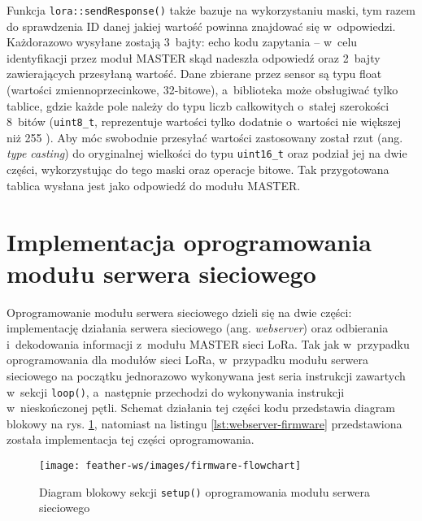 \FloatBarrier
Funkcja \texttt{lora::sendResponse()} także bazuje na wykorzystaniu maski, tym razem do sprawdzenia ID danej jakiej
wartość powinna znajdować się w~odpowiedzi. Każdorazowo wysyłane zostają 3~bajty: echo kodu zapytania -- w~celu
identyfikacji przez moduł MASTER skąd nadeszła odpowiedź oraz 2~bajty zawierających przesyłaną wartość. Dane zbierane
przez sensor są typu float (wartości zmiennoprzecinkowe, 32-bitowe), a~biblioteka może obsługiwać tylko tablice, gdzie
każde pole należy do typu liczb całkowitych o~stałej szerokości 8~bitów (\texttt{uint8\_t}, reprezentuje wartości tylko
dodatnie o~wartości nie większej niż 255 \cite{cpp-fwinteger}). Aby móc swobodnie przesyłać wartości zastosowany został
rzut (ang. \textsl{type casting}) do oryginalnej wielkości do typu \texttt{uint16\_t} oraz podział jej na dwie części,
wykorzystując do tego maski oraz operacje bitowe. Tak przygotowana tablica wysłana jest jako odpowiedź do modułu MASTER.

\FloatBarrier
\section{Implementacja oprogramowania modułu serwera sieciowego\label{sect:firmware-webserver}} Oprogramowanie modułu
serwera sieciowego dzieli się na dwie części: implementację działania serwera sieciowego (ang. \textsl{webserver}) oraz
odbierania i~dekodowania informacji z~modułu MASTER sieci LoRa. Tak jak w~przypadku oprogramowania dla modułów sieci
LoRa, w~przypadku modułu serwera sieciowego na początku jednorazowo wykonywana jest seria instrukcji zawartych w~sekcji
\texttt{loop()}, a~następnie przechodzi do wykonywania instrukcji w~nieskończonej pętli. Schemat działania tej części
kodu przedstawia diagram blokowy na rys. \ref{img:webserver-firmware}, natomiast na listingu
\ref{lst:webserver-firmware} przedstawiona została implementacja tej części oprogramowania.

\begin{figure}[!htbp]
    \centering
    \texttt{[image: feather-ws/images/firmware-flowchart]}
    \caption{\label{img:webserver-firmware}Diagram blokowy sekcji \texttt{setup()} oprogramowania modułu
        serwera sieciowego}
\end{figure}



